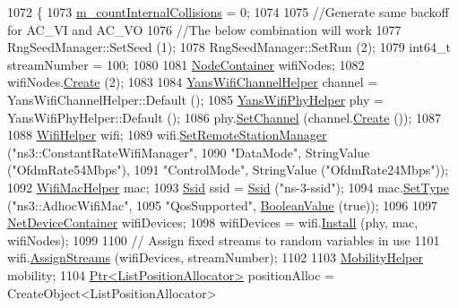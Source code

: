 \begin{DoxyCode}
1072 \{
1073   \hyperlink{classBug2222TestCase_a0459c1e5f762d2ef06af67617cb4fb5f}{m\_countInternalCollisions} = 0;
1074 
1075   \textcolor{comment}{//Generate same backoff for AC\_VI and AC\_VO}
1076   \textcolor{comment}{//The below combination will work}
1077   RngSeedManager::SetSeed (1);
1078   RngSeedManager::SetRun (2);
1079   int64\_t streamNumber = 100;
1080 
1081   \hyperlink{classns3_1_1NodeContainer}{NodeContainer} wifiNodes;
1082   wifiNodes.\hyperlink{classns3_1_1NodeContainer_a787f059e2813e8b951cc6914d11dfe69}{Create} (2);
1083 
1084   \hyperlink{classns3_1_1YansWifiChannelHelper}{YansWifiChannelHelper} channel = YansWifiChannelHelper::Default ();
1085   \hyperlink{classns3_1_1YansWifiPhyHelper}{YansWifiPhyHelper} phy = YansWifiPhyHelper::Default ();
1086   phy.\hyperlink{classns3_1_1YansWifiPhyHelper_ad2e9a27587dd4ff320435c93cc2676de}{SetChannel} (channel.\hyperlink{classns3_1_1YansWifiChannelHelper_a0532e292ab9452f3cf630c848708e563}{Create} ());
1087 
1088   \hyperlink{classns3_1_1WifiHelper}{WifiHelper} wifi;
1089   wifi.\hyperlink{classns3_1_1WifiHelper_a3d01b178aeb2de246ab5a3aa5638ce24}{SetRemoteStationManager} (\textcolor{stringliteral}{"ns3::ConstantRateWifiManager"},
1090                                 \textcolor{stringliteral}{"DataMode"}, StringValue (\textcolor{stringliteral}{"OfdmRate54Mbps"}),
1091                                 \textcolor{stringliteral}{"ControlMode"}, StringValue (\textcolor{stringliteral}{"OfdmRate24Mbps"}));
1092   \hyperlink{classns3_1_1WifiMacHelper}{WifiMacHelper} mac;
1093   \hyperlink{classns3_1_1Ssid}{Ssid} ssid = \hyperlink{classns3_1_1Ssid}{Ssid} (\textcolor{stringliteral}{"ns-3-ssid"});
1094   mac.\hyperlink{classns3_1_1WifiMacHelper_a382d8df76a1dd7007179d1963b4b6bc6}{SetType} (\textcolor{stringliteral}{"ns3::AdhocWifiMac"},
1095                \textcolor{stringliteral}{"QosSupported"}, \hyperlink{classns3_1_1BooleanValue}{BooleanValue} (\textcolor{keyword}{true}));
1096 
1097   \hyperlink{classns3_1_1NetDeviceContainer}{NetDeviceContainer} wifiDevices;
1098   wifiDevices = wifi.\hyperlink{classns3_1_1WifiHelper_a451b3d33fa1497c22f06c5451f57a127}{Install} (phy, mac, wifiNodes);
1099 
1100   \textcolor{comment}{// Assign fixed streams to random variables in use}
1101   wifi.\hyperlink{classns3_1_1WifiHelper_ab29bf13f8726c2e0807a583bfea79777}{AssignStreams} (wifiDevices, streamNumber);
1102 
1103   \hyperlink{classns3_1_1MobilityHelper}{MobilityHelper} mobility;
1104   \hyperlink{classns3_1_1Ptr}{Ptr<ListPositionAllocator>} positionAlloc = CreateObject<ListPositionAllocator> 

\end{DoxyCode}
